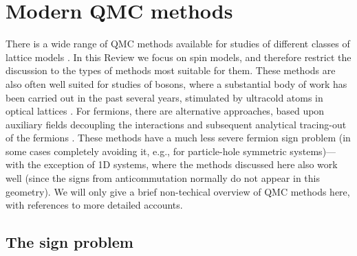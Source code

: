 \documentclass[10pt,pre,aps,twocolumn,showpacs,superscriptaddress,floatfix]{revtex4-1}
\begin{document}
\section{Modern QMC methods}
\label{sec:methods}

There is a wide range of QMC methods available for studies of different classes of lattice models \cite{Assaad07,Evertz03,Sandvik10b}. In this Review we 
focus on spin models, and therefore restrict the discussion to the types of methods most suitable for them. These methods are also often well suited for studies 
of bosons, where a substantial body of work has been carried out in the past several years, stimulated by ultracold atoms in optical 
lattices \cite{Kashurnikov02,Wessel04,Kato08,Pollet10}. For fermions, there are alternative approaches, based upon auxiliary fields decoupling the interactions and 
subsequent analytical tracing-out of the fermions \cite{Hirsch82,Assaad07}. These methods have a much less severe fermion sign problem (in some cases completely 
avoiding it, e.g., for particle-hole symmetric systems)---with the exception of 1D systems, where the methods discussed here also work well (since the signs 
from anticommutation normally do not appear in this geometry). We will only give a brief non-techical overview of QMC methods here, with references to 
more detailed accounts.

\subsection{The sign problem}
\label{ss:sign}
\end{document}
